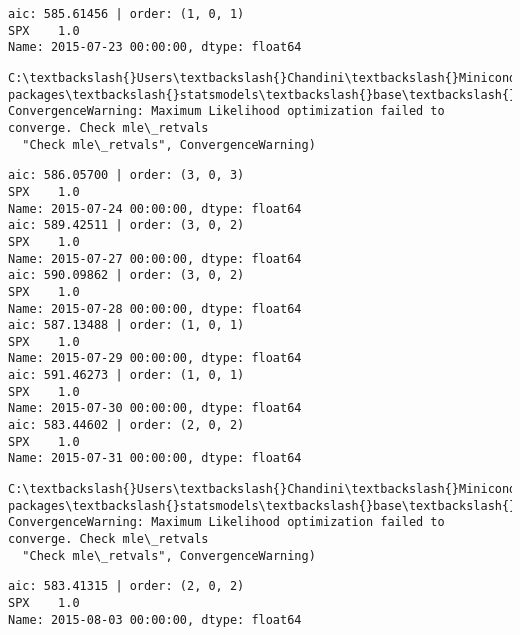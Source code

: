 \documentclass[11pt]{article}
\begin{document}
    \begin{Verbatim}[commandchars=\\\{\}]
aic: 585.61456 | order: (1, 0, 1)
SPX    1.0
Name: 2015-07-23 00:00:00, dtype: float64

    \end{Verbatim}

    \begin{Verbatim}[commandchars=\\\{\}]
C:\textbackslash{}Users\textbackslash{}Chandini\textbackslash{}Miniconda3\textbackslash{}envs\textbackslash{}auquan\textbackslash{}lib\textbackslash{}site-packages\textbackslash{}statsmodels\textbackslash{}base\textbackslash{}model.py:496: ConvergenceWarning: Maximum Likelihood optimization failed to converge. Check mle\_retvals
  "Check mle\_retvals", ConvergenceWarning)

    \end{Verbatim}

    \begin{Verbatim}[commandchars=\\\{\}]
aic: 586.05700 | order: (3, 0, 3)
SPX    1.0
Name: 2015-07-24 00:00:00, dtype: float64
aic: 589.42511 | order: (3, 0, 2)
SPX    1.0
Name: 2015-07-27 00:00:00, dtype: float64
aic: 590.09862 | order: (3, 0, 2)
SPX    1.0
Name: 2015-07-28 00:00:00, dtype: float64
aic: 587.13488 | order: (1, 0, 1)
SPX    1.0
Name: 2015-07-29 00:00:00, dtype: float64
aic: 591.46273 | order: (1, 0, 1)
SPX    1.0
Name: 2015-07-30 00:00:00, dtype: float64
aic: 583.44602 | order: (2, 0, 2)
SPX    1.0
Name: 2015-07-31 00:00:00, dtype: float64

    \end{Verbatim}

    \begin{Verbatim}[commandchars=\\\{\}]
C:\textbackslash{}Users\textbackslash{}Chandini\textbackslash{}Miniconda3\textbackslash{}envs\textbackslash{}auquan\textbackslash{}lib\textbackslash{}site-packages\textbackslash{}statsmodels\textbackslash{}base\textbackslash{}model.py:496: ConvergenceWarning: Maximum Likelihood optimization failed to converge. Check mle\_retvals
  "Check mle\_retvals", ConvergenceWarning)

    \end{Verbatim}

    \begin{Verbatim}[commandchars=\\\{\}]
aic: 583.41315 | order: (2, 0, 2)
SPX    1.0
Name: 2015-08-03 00:00:00, dtype: float64

    \end{Verbatim}
\end{document}
